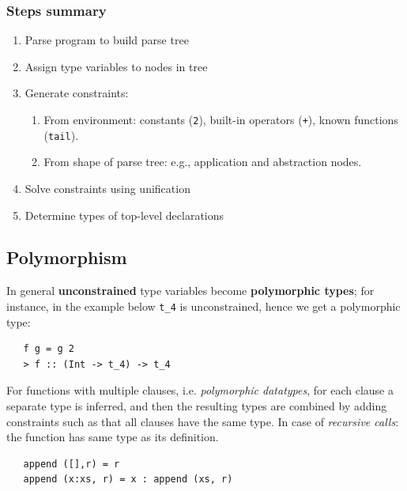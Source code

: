 \subsubsection{Steps summary}
\begin{enumerate}
   \item Parse program to build parse tree
   \item Assign type variables to nodes in tree
   \item Generate constraints:
   \begin{enumerate}
      \item From environment: constants (\lstinline|2|), built-in
      operators (\lstinline|+|), known functions (\lstinline|tail|).
      \item From shape of parse tree: e.g., application and
      abstraction nodes.
   \end{enumerate}
   \item Solve constraints using unification
   \item Determine types of top-level declarations
\end{enumerate}

\subsection{Polymorphism}

In general \textbf{unconstrained} type variables become \textbf{polymorphic types};
for instance, in the example below \lstinline|t_4| is unconstrained, hence we get a polymorphic type:
\begin{lstlisting}
   f g = g 2
   > f :: (Int -> t_4) -> t_4
\end{lstlisting}
\nl

For functions with multiple clauses, i.e. \textit{polymorphic datatypes},
for each clause a separate type is inferred, 
and then the resulting types are combined by adding constraints such as that all clauses have the same type.
In case of \textit{recursive calls}:
the function has same type as its definition.

\begin{lstlisting}
   append ([],r) = r
   append (x:xs, r) = x : append (xs, r)
\end{lstlisting}

